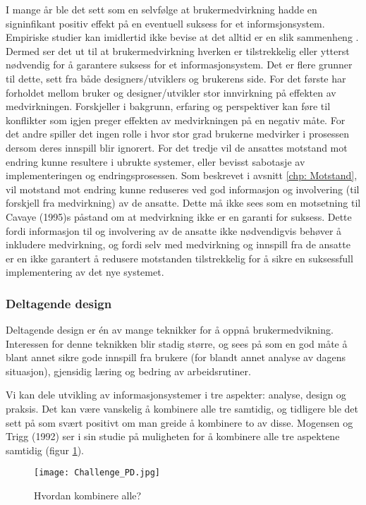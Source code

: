\noindent
I mange år ble det sett som en selvfølge at brukermedvirkning hadde en signinfikant positiv effekt på en eventuell suksess for et informsjonsystem. Empiriske studier kan imidlertid ikke bevise at det alltid er en slik sammenheng \cite{Cavaye95}. Dermed ser det ut til at brukermedvirkning hverken er tilstrekkelig eller ytterst nødvendig for å garantere suksess for et informasjonsystem. 
Det er flere grunner til dette, sett fra både designers/utviklers og brukerens side. For det første har forholdet mellom bruker og designer/utvikler stor innvirkning på effekten av medvirkningen. Forskjeller i bakgrunn, erfaring og perspektiver kan føre til konflikter som igjen preger effekten av medvirkningen på en negativ måte. For det andre spiller det ingen rolle i hvor stor grad brukerne medvirker i prosessen dersom deres innspill blir ignorert. For det tredje vil de ansattes motstand mot endring kunne resultere i ubrukte systemer, eller bevisst sabotasje av implementeringen og endringsprosessen. Som beskrevet i avsnitt \ref{chp: Motstand}, vil motstand mot endring kunne reduseres ved god informasjon og involvering (til forskjell fra medvirkning) av de ansatte. Dette må ikke sees som en motsetning til Cavaye (1995)s påstand om at medvirkning ikke er en garanti for suksess. Dette fordi informasjon til og involvering av de ansatte ikke nødvendigvis behøver å inkludere medvirkning, og fordi selv med medvirkning og innspill fra de ansatte er en ikke garantert å redusere motstanden tilstrekkelig for å sikre en suksessfull implementering av det nye systemet. \cite{Cavaye95}

\subsubsection{Deltagende design}
Deltagende design er én av mange teknikker for å oppnå brukermedvikning.
Interessen for denne teknikken blir stadig større, og sees på som en god måte å blant annet sikre gode innspill fra brukere (for blandt annet analyse av dagens situasjon), gjensidig læring og bedring av arbeidsrutiner.

\noindent
Vi kan dele utvikling av informasjonsystemer i tre aspekter: analyse, design og praksis. Det kan være vanskelig å kombinere alle tre samtidig, og tidligere ble det sett på som svært positivt om man greide å kombinere to av disse. Mogensen og Trigg (1992) ser i sin studie på muligheten for å kombinere alle tre aspektene samtidig (figur \ref{Challenge_PD}).

\begin{figure}[H]
\centering
\texttt{[image: Challenge\_PD.jpg]}
\caption{Hvordan kombinere alle?}
\label{Challenge_PD}
\end{figure}

